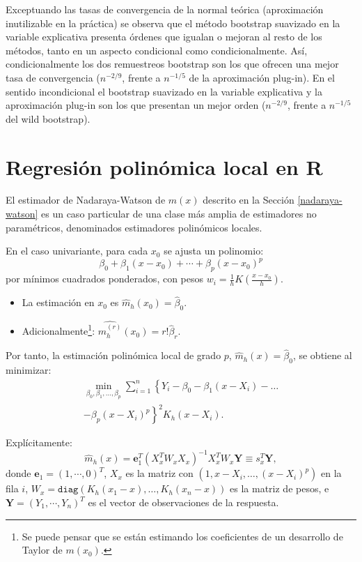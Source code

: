 \documentclass[
]{book}
\theoremstyle{break}
\theoremstyle{definition}
\theoremstyle{definition}
\theoremstyle{definition}
\theoremstyle{remark}
\begin{document}
Exceptuando las tasas de convergencia de la normal teórica (aproximación
inutilizable en la práctica) se observa que el método bootstrap
suavizado en la variable explicativa presenta órdenes que igualan o
mejoran al resto de los métodos, tanto en un aspecto condicional como
condicionalmente. Así, condicionalmente los dos remuestreos bootstrap
son los que ofrecen una mejor tasa de convergencia (\(n^{-2/9}\),
frente a \(n^{-1/5}\) de la aproximación plug-in). En el
sentido incondicional el bootstrap suavizado en la variable explicativa
y la aproximación plug-in son los que presentan un mejor orden
(\(n^{-2/9}\), frente a \(n^{-1/5}\) del wild bootstrap).

\hypertarget{locpol-r}{%
\section{Regresión polinómica local en R}\label{locpol-r}}

El estimador de Nadaraya-Watson de \(m(x)\) descrito en la Sección \ref{nadaraya-watson}
es un caso particular de una clase más amplia de estimadores no paramétricos,
denominados estimadores polinómicos locales.

En el caso univariante, para cada \(x_0\) se ajusta un polinomio:
\[\beta_0+\beta_{1}\left(x - x_0\right) + \cdots 
+ \beta_{p}\left( x-x_0\right)^{p}\]
por mínimos cuadrados ponderados, con pesos
\(w_{i} = \frac{1}{h}K\left(\frac{x-x_0}{h}\right)\).

\begin{itemize}
\item
  La estimación en \(x_0\) es \(\hat{m}_{h}(x_0)=\hat{\beta}_0\).
\item
  Adicionalmente\footnote{Se puede pensar que se están estimando los coeficientes de
    un desarrollo de Taylor de \(m(x_0)\).}:
  \(\widehat{m_{h}^{(r)}}(x_0) = r!\hat{\beta}_{r}\).
\end{itemize}

Por tanto, la estimación polinómica local de grado \(p\), \(\hat{m}_{h}(x)=\hat{\beta}_0\), se obtiene al minimizar:
\[\begin{aligned}
    \min_{\beta_0 ,\beta_1, \ldots, \beta_p}
    \sum_{i=1}^{n}\left\{ Y_{i} - \beta_0 
    -\beta_1(x - X_i) - \ldots \right. \nonumber \\
    \left. -\beta_p(x - X_i)^p \right\}^{2}
    K_{h}(x - X_i).
\end{aligned}\]

Explícitamente:
\[\hat{m}_{h}(x) = \mathbf{e}_{1}^{T} \left(
X_{x}^{T} {W}_{x} 
X_{x} \right)^{-1} X_{x}^{T} 
{W}_{x}\mathbf{Y} \equiv {s}_{x}^{T}\mathbf{Y},\]
donde \(\mathbf{e}_{1} = \left( 1, \cdots, 0\right)^{T}\), \(X_{x}\)
es la matriz con \((1,x - X_i, \ldots, (x - X_i)^p)\) en la fila \(i\),
\(W_{x} = \mathtt{diag} \left( K_{h}(x_{1} - x), \ldots, K_{h}(x_{n} - x) \right)\)
es la matriz de pesos, e \(\mathbf{Y} = \left( Y_1, \cdots, Y_n\right)^{T}\) es el vector de observaciones de la respuesta.
\end{document}
